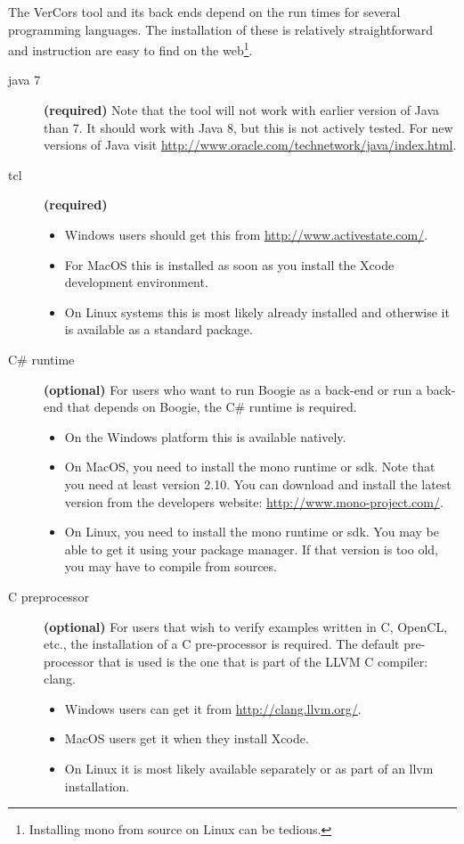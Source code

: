 The VerCors tool and its back ends depend on the run times for several programming languages.
The installation of these is relatively straightforward and instruction are easy to find
on the web\footnote{Installing mono from source on Linux can be tedious.}.
\begin{description}
\item[java 7] \textbf{(required)} Note that the tool will not work with earlier version of Java than 7.
It should work with Java 8, but this is not actively tested.
For new versions of Java visit \url{http://www.oracle.com/technetwork/java/index.html}.
\item[tcl] \textbf{(required)}
\begin{itemize}[topsep=-1em]
\item Windows users should get this from \url{http://www.activestate.com/}.
\item For MacOS this is installed as soon as you install the Xcode development environment.
\item On Linux systems this is most likely already installed and otherwise it is available as a standard package.
\end{itemize}
\item[C\# runtime] \textbf{(optional)} For users who want to run Boogie as a back-end or run a back-end
that depends on Boogie, the C\# runtime is required.
\begin{itemize}[topsep=-1em]
\item On the Windows platform this is available natively.
\item On MacOS, you need to install
the mono runtime or sdk. Note that you need at least version 2.10. You can download and install the latest version from the developers website: \url{http://www.mono-project.com/}.
\item On Linux, you need to install
the mono runtime or sdk. You may be able to get it using
your package manager. If that version is too old, you may have to
compile from sources.
\end{itemize}
\item[C preprocessor] \textbf{(optional)} For users that wish to verify examples written
in C, OpenCL, etc., the installation of a C pre-processor is required.
The default pre-processor that is used is the one that is part of the
LLVM C compiler: clang.
\begin{itemize}
\item Windows users can get it from \url{http://clang.llvm.org/}. 
\item MacOS users get it when they install Xcode.
\item On Linux it is most likely available separately or as part of an
  llvm installation.
\end{itemize}
\end{description}

